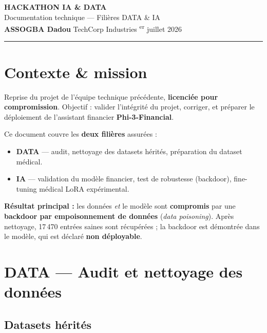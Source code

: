 \documentclass[11pt,a4paper]{article}
\begin{document}
\begin{center}
{\LARGE\textbf{HACKATHON IA \& DATA}}\\[6pt]
{\large Documentation technique — Filières DATA \& IA}\\[10pt]
{\normalsize \textbf{ASSOGBA Dadou} \quad\textbullet\quad TechCorp Industries \quad\textbullet{}\textsuperscript{er} juillet 2026}
\end{center}
\vspace{4pt}
\hrule
\vspace{10pt}

\section{Contexte \& mission}

Reprise du projet de l'équipe technique précédente, \textbf{licenciée pour
compromission}. Objectif : valider l'intégrité du projet, corriger, et préparer
le déploiement de l'assistant financier \textbf{Phi-3-Financial}.

Ce document couvre les \textbf{deux filières} assurées :
\begin{itemize}[leftmargin=1.4em,itemsep=1pt]
  \item \textbf{DATA} — audit, nettoyage des datasets hérités, préparation du dataset médical.
  \item \textbf{IA} — validation du modèle financier, test de robustesse (backdoor),
  fine-tuning médical LoRA expérimental.
\end{itemize}

\noindent\textbf{Résultat principal :} les données \emph{et} le modèle sont
\textbf{compromis} par une \textbf{backdoor par empoisonnement de données}
(\emph{data poisoning}). Après nettoyage, 17\,470 entrées saines sont récupérées ;
la backdoor est démontrée dans le modèle, qui est déclaré \textbf{non déployable}.

\section{DATA — Audit et nettoyage des données}

\subsection{Datasets hérités}
\end{document}
